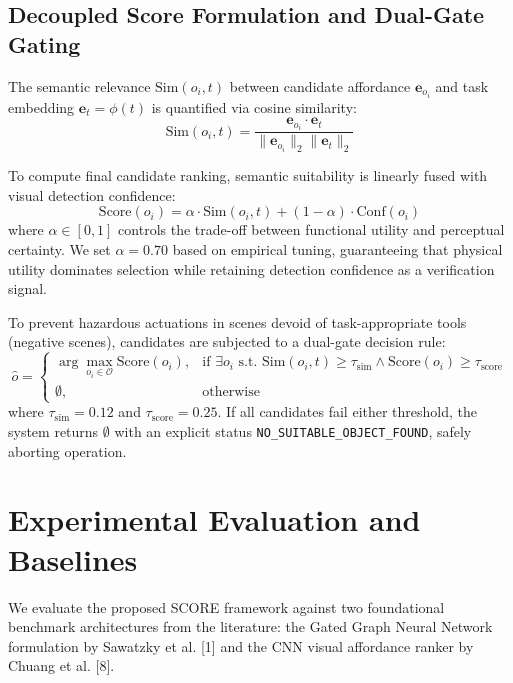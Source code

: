 \documentclass[conference]{IEEEtran}
\begin{document}
\subsection{Decoupled Score Formulation and Dual-Gate Gating}
The semantic relevance $\text{Sim}(o_i, t)$ between candidate affordance $\mathbf{e}_{o_i}$ and task embedding $\mathbf{e}_t = \phi(t)$ is quantified via cosine similarity:
\begin{equation}
    \text{Sim}(o_i, t) = \frac{\mathbf{e}_{o_i} \cdot \mathbf{e}_t}{\|\mathbf{e}_{o_i}\|_2 \|\mathbf{e}_t\|_2}
    \label{eq:sim}
\end{equation}

To compute final candidate ranking, semantic suitability is linearly fused with visual detection confidence:
\begin{equation}
    \text{Score}(o_i) = \alpha \cdot \text{Sim}(o_i, t) + (1 - \alpha) \cdot \text{Conf}(o_i)
    \label{eq:score}
\end{equation}
where $\alpha \in [0, 1]$ controls the trade-off between functional utility and perceptual certainty. We set $\alpha = 0.70$ based on empirical tuning, guaranteeing that physical utility dominates selection while retaining detection confidence as a verification signal.

To prevent hazardous actuations in scenes devoid of task-appropriate tools (negative scenes), candidates are subjected to a dual-gate decision rule:
\begin{equation}
    \hat{o} = \begin{cases}
    \arg\max_{o_i \in \mathcal{O}} \text{Score}(o_i), & \text{if } \exists o_i \text{ s.t. } \text{Sim}(o_i, t) \ge \tau_{\text{sim}} \wedge \text{Score}(o_i) \ge \tau_{\text{score}} \\
    \emptyset, & \text{otherwise}
    \end{cases}
    \label{eq:gating}
\end{equation}
where $\tau_{\text{sim}} = 0.12$ and $\tau_{\text{score}} = 0.25$. If all candidates fail either threshold, the system returns $\emptyset$ with an explicit status \texttt{NO\_SUITABLE\_OBJECT\_FOUND}, safely aborting operation.

\section{Experimental Evaluation and Baselines}
We evaluate the proposed SCORE framework against two foundational benchmark architectures from the literature: the Gated Graph Neural Network formulation by Sawatzky et al. [1] and the CNN visual affordance ranker by Chuang et al. [8]. 
\end{document}
